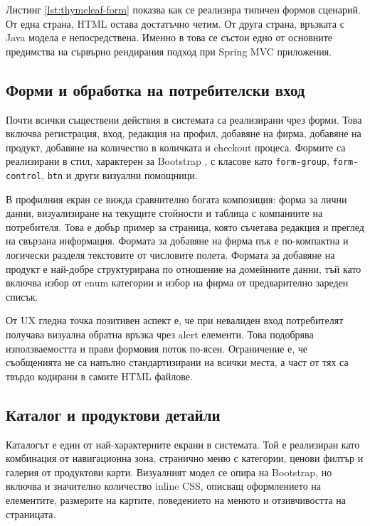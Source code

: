 Листинг \ref{lst:thymeleaf-form} показва как се реализира типичен формов сценарий. От една страна, HTML остава достатъчно четим. От друга страна, връзката с Java модела е непосредствена. Именно в това се състои едно от основните предимства на сървърно рендирания подход при Spring MVC приложения.

\subsection{Форми и обработка на потребителски вход}

Почти всички съществени действия в системата са реализирани чрез форми. Това включва регистрация, вход, редакция на профил, добавяне на фирма, добавяне на продукт, добавяне на количество в количката и checkout процеса. Формите са реализирани в стил, характерен за Bootstrap \cite{bootstrap}, с класове като \texttt{form-group}, \texttt{form-control}, \texttt{btn} и други визуални помощници.

В профилния екран се вижда сравнително богата композиция: форма за лични данни, визуализиране на текущите стойности и таблица с компаниите на потребителя. Това е добър пример за страница, която съчетава редакция и преглед на свързана информация. Формата за добавяне на фирма пък е по-компактна и логически разделя текстовите от числовите полета. Формата за добавяне на продукт е най-добре структурирана по отношение на домейнните данни, тъй като включва избор от enum категории и избор на фирма от предварително зареден списък.

От UX гледна точка позитивен аспект е, че при невалиден вход потребителят получава визуална обратна връзка чрез alert елементи. Това подобрява използваемостта и прави формовия поток по-ясен. Ограничение е, че съобщенията не са напълно стандартизирани на всички места, а част от тях са твърдо кодирани в самите HTML файлове.

\subsection{Каталог и продуктови детайли}

Каталогът е един от най-характерните екрани в системата. Той е реализиран като комбинация от навигационна зона, странично меню с категории, ценови филтър и галерия от продуктови карти. Визуалният модел се опира на Bootstrap, но включва и значително количество inline CSS, описващ оформлението на елементите, размерите на картите, поведението на менюто и отзивчивостта на страницата.

